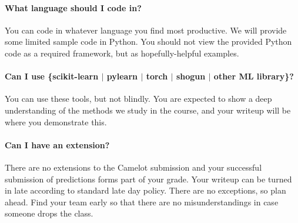 \documentclass[12pt,letterpaper]{article}
\begin{document}
\paragraph{What language should I code in?}
You can code in whatever language you find most productive.  We will
provide some limited sample code in Python.  You should not view the
provided Python code as a required framework, but as hopefully-helpful
examples.

\paragraph{Can I use \{scikit-learn $|$ pylearn $|$ torch $|$ shogun $|$ other ML library\}?}
You can use these tools, but not blindly.  You are expected to show a
deep understanding of the methods we study in the course, and your
writeup will be where you demonstrate this.

\paragraph{Can I have an extension?}
There are no extensions to the Camelot submission and your successful
submission of predictions forms part of your grade.  Your writeup can
be turned in late according to standard late day policy.  There are no
exceptions, so plan ahead.  Find your team early so that there are no
misunderstandings in case someone drops the class.
\end{document}
